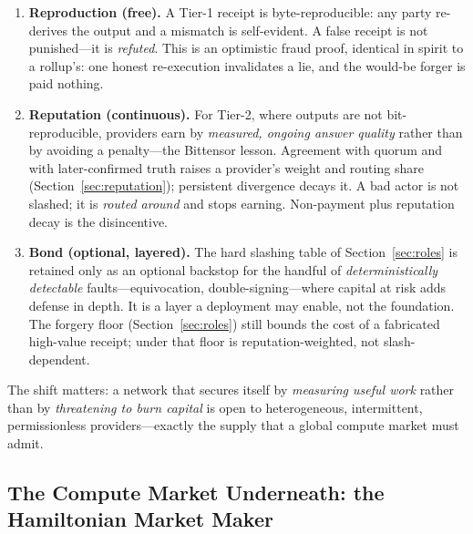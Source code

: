 \begin{enumerate}[leftmargin=1.4em]
\item \textbf{Reproduction (free).} A Tier-1 receipt is byte-reproducible: any party re-derives the output and a mismatch is self-evident. A false receipt is not punished---it is \emph{refuted}. This is an optimistic fraud proof, identical in spirit to a rollup's: one honest re-execution invalidates a lie, and the would-be forger is paid nothing.
\item \textbf{Reputation (continuous).} For Tier-2, where outputs are not bit-reproducible, providers earn by \emph{measured, ongoing answer quality} rather than by avoiding a penalty---the Bittensor lesson. Agreement with quorum and with later-confirmed truth raises a provider's weight and routing share (Section~\ref{sec:reputation}); persistent divergence decays it. A bad actor is not slashed; it is \emph{routed around} and stops earning. Non-payment plus reputation decay is the disincentive.
\item \textbf{Bond (optional, layered).} The hard slashing table of Section~\ref{sec:roles} is retained only as an optional backstop for the handful of \emph{deterministically detectable} faults---equivocation, double-signing---where capital at risk adds defense in depth. It is a layer a deployment may enable, not the foundation. The forgery floor (Section~\ref{sec:roles}) still bounds the cost of a fabricated high-value receipt; under \PoAI{} that floor is reputation-weighted, not slash-dependent.
\end{enumerate}

The shift matters: a network that secures itself by \emph{measuring useful work} rather than by \emph{threatening to burn capital} is open to heterogeneous, intermittent, permissionless providers---exactly the supply that a global compute market must admit.

\subsection{The Compute Market Underneath: the Hamiltonian Market Maker}
\label{sec:ai-bitcoin-hmm}

